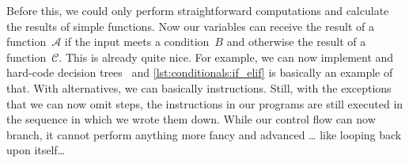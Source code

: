 Before this, we could only perform straightforward computations and calculate the results of simple functions.
Now our variables can receive the result of a function~${\mathcal{A}}$ if the input meets a condition~$B$ and otherwise the result of a function~${\mathcal{C}}$.
This is already quite nice.
For example, we can now implement and hard-code decision trees~\cite{RN2022AIAMA,SSBD2014UMLFTTA} and \cref{lst:conditionals:if_elif} is basically an example of that.
With alternatives, we can basically  instructions.
Still, with the exceptions that we can now omit steps, the instructions in our programs are still executed in the sequence in which we wrote them down.
While our control flow can now branch, it cannot perform anything more fancy and advanced {\dots} like looping back upon itself\dots%
\endhsection%
%
\FloatBarrier%
\endhsection%
%
